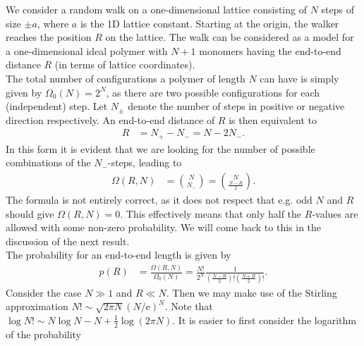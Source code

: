 \documentclass[english, parskip=full]{scrartcl}
\title{\titel}
\author{\autor}
\date{\today}
\newcommand{\kla}{}
\newcommand{\e}{\text{e}}
\begin{document}
\maketitle  %

We consider a random walk on a one-dimensional lattice consisting of $N$ steps of size $\pm a$, where $a$ is the 1D lattice constant.
Starting at the origin, the walker reaches the position $R$ on the lattice.
The walk can be considered as a model for a one-dimensional ideal polymer with $N+1$ monomers having the end-to-end distance $R$ (in terms of lattice coordinates).
\\
The total number of configurations a polymer of length $N$ can have is simply given by $\Omega_0(N) = 2^N$, as there are two possible configurations for each (independent) step.
Let $N_\pm$ denote the number of steps in positive or negative direction respectively.
An end-to-end distance of $R$ is then equivalent to 
\begin{align}
R &= N_+ - N_- = N - 2N_-.
\end{align}
In this form it is evident that we are looking for the number of possible combinations of the $N_-$-steps, leading to
\begin{align}
\Omega(R,N) &= \binom{N}{N_-} = \binom{N}{\frac{N-R}{2}}.
\end{align}
The formula is not entirely correct, as it does not respect that e.g. odd $N$ and $R$ should give $\Omega(R,N)=0$.
This effectively means that only half the $R$-values are allowed with some non-zero probability. 
We will come back to this in the discussion of the next result.
\\
The probability for an end-to-end length is given by
\begin{align}
p(R) &= \frac{\Omega(R,N)}{\Omega_0(N)} = \frac{N!}{2^N}\frac{1}{\kla\left( \frac{N-R}{2} \right)! \kla\left( \frac{N+R}{2} \right)!}.
\end{align}
Consider the case $N\gg 1$ and $R\ll N$.
Then we may make use of the Stirling approximation $N!\sim\sqrt{2\pi N}(N/\e)^N$.
Note that $\log N! \sim N\log N - N + \frac{1}{2}\log (2\pi N)$.
It is easier to first consider the logarithm of the probability
\end{document}
